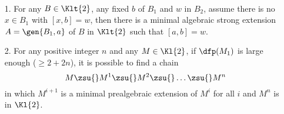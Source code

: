 \begin{rem}\label{prealgchain}{\ }
\begin{itemize}
\item[1.]For any $B\in\Klt{2}$, any fixed $b$ of $B_{1}$ and $w$ in $B_{2}$, assume there is no $x\in B_{1}$ with $[x,b]=w$, then there
is a minimal algebraic strong extension $A=\gen{B_{1},a}$ of $B$ in $\Klt{2}$ such that $[a,b]=w$.

\item[2.]For any positive integer $n$ and any  $M\in\Kl{2}$,
if $\dfp(M_{1})$ is large enough ($\geq2+2n$), it is possible to find a chain $$M\zsu{}M^{1}\zsu{}M^{2}\zsu{}\dots\zsu{}M^{n}$$
in which $M^{i+1}$ is a minimal prealgebraic extension of $M^{i}$ for all $i$ and $M^{n}$ is in $\Kl{2}$.
\end{itemize}
\end{rem}
